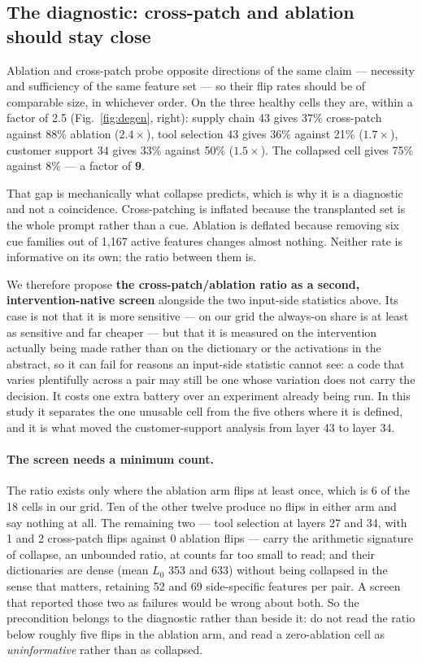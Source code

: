 \documentclass{article}
\begin{document}
\subsection{The diagnostic: cross-patch and ablation should stay close}

Ablation and cross-patch probe opposite directions of the same claim --- necessity and sufficiency of the same feature set --- so their flip rates should be of comparable size, in whichever order. On the three healthy cells they are, within a factor of 2.5 (Fig.~\ref{fig:degen}, right): supply chain 43 gives 37\% cross-patch against 88\% ablation ($2.4\times$), tool selection 43 gives 36\% against 21\% ($1.7\times$), customer support 34 gives 33\% against 50\% ($1.5\times$). The collapsed cell gives 75\% against 8\% --- a factor of \textbf{9}.

That gap is mechanically what collapse predicts, which is why it is a diagnostic and not a coincidence. Cross-patching is inflated because the transplanted set is the whole prompt rather than a cue. Ablation is deflated because removing six cue families out of 1{,}167 active features changes almost nothing. Neither rate is informative on its own; the ratio between them is.

We therefore propose \textbf{the cross-patch/ablation ratio as a second, intervention-native screen} alongside the two input-side statistics above. Its case is not that it is more sensitive --- on our grid the always-on share is at least as sensitive and far cheaper --- but that it is measured on the intervention actually being made rather than on the dictionary or the activations in the abstract, so it can fail for reasons an input-side statistic cannot see: a code that varies plentifully across a pair may still be one whose variation does not carry the decision. It costs one extra battery over an experiment already being run. In this study it separates the one unusable cell from the five others where it is defined, and it is what moved the customer-support analysis from layer 43 to layer 34.

\paragraph{The screen needs a minimum count.} The ratio exists only where the ablation arm flips at least once, which is 6 of the 18 cells in our grid. Ten of the other twelve produce no flips in either arm and say nothing at all. The remaining two --- tool selection at layers 27 and 34, with 1 and 2 cross-patch flips against 0 ablation flips --- carry the arithmetic signature of collapse, an unbounded ratio, at counts far too small to read; and their dictionaries are dense (mean $L_0$ 353 and 633) without being collapsed in the sense that matters, retaining 52 and 69 side-specific features per pair. A screen that reported those two as failures would be wrong about both. So the precondition belongs to the diagnostic rather than beside it: do not read the ratio below roughly five flips in the ablation arm, and read a zero-ablation cell as \emph{uninformative} rather than as collapsed.
\end{document}
